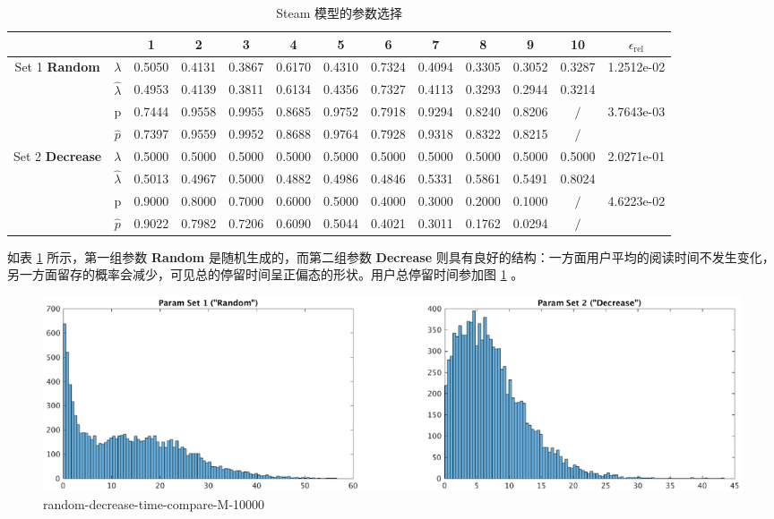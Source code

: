 \documentclass[UTF8]{ctexart}
\theoremstyle{plain}
\theoremstyle{definition}
\theoremstyle{remark}
\begin{document}
	\begin{table}[]
		\centering
		\caption{Steam 模型的参数选择}
		\label{tab:steam-param}
		\begin{tabular}{cc|cccccccccc|c}
			\hline
			&                                         & 1 & 2 & 3 & 4 & 5 & 6 & 7 & 8 & 9 & 10 & $\epsilon_{\text{rel}}$\\
			\hline
			\multirow{4}{*}{Set 1 \textbf{Random}} 	& $\lambda$       & 0.5050   & 0.4131  &  0.3867 &   0.6170  &  0.4310 & 0.7324 &   0.4094  &  0.3305 &   0.3052  &  0.3287 & \multirow{2}{*}{1.2512e-02} \\
								   	& $\hat{\lambda}$ & 0.4953 &   0.4139  &  0.3811  &  0.6134 &   0.4356  &  0.7327 &   0.4113   & 0.3293 &   0.2944   & 0.3214  & \\
								   	& p               &  0.7444  &  0.9558  &  0.9955  &  0.8685 &   0.9752 &0.7918 &   0.9294  &  0.8240  &  0.8206& $\slash$ & \multirow{2}{*}{3.7643e-03} \\
									& $\hat{p}$       &  0.7397   & 0.9559  &  0.9952  &  0.8688  &  0.9764 & 0.7928   & 0.9318 &   0.8322   & 0.8215& $\slash$ & \\
			\hline
			\multirow{4}{*}{Set 2 \textbf{Decrease}} 	& $\lambda$       & 0.5000  &  0.5000  &0.5000  &0.5000  &0.5000  &0.5000  &0.5000  &0.5000  &0.5000  &0.5000  &\multirow{2}{*}{2.0271e-01} \\
			& $\hat{\lambda}$ &0.5013  &  0.4967&    0.5000  &  0.4882   & 0.4986 &0.4846   & 0.5331 &   0.5861   & 0.5491 &   0.8024  & \\
			& p               &  0.9000  &  0.8000  &  0.7000  &  0.6000   & 0.5000& 0.4000  &  0.3000  &  0.2000  &  0.1000& $\slash$ & \multirow{2}{*}{4.6223e-02} \\
			& $\hat{p}$       &  0.9022   & 0.7982  &  0.7206   & 0.6090  &  0.5044 &0.4021 &   0.3011  &  0.1762   & 0.0294&$\slash$ & \\
		\end{tabular}
	\end{table}

	如表 \ref{tab:steam-param} 所示，第一组参数 \textbf{Random} 是随机生成的，而第二组参数 \textbf{Decrease} 则具有良好的结构：一方面用户平均的阅读时间不发生变化，另一方面留存的概率会减少，可见总的停留时间呈正偏态的形状。用户总停留时间参加图 \ref{fig:random-decrease-time-compare-M-10000} 。
	
	\begin{figure}[h!] 
		\centering
		\includegraphics[width = \linewidth]{../model/steam/pic/random-decrease-time-compare-M-10000.eps}
		\caption{random-decrease-time-compare-M-10000}\label{fig:random-decrease-time-compare-M-10000}
	\end{figure}
\end{document}
